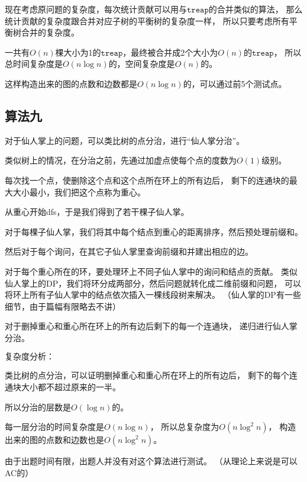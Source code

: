 \documentclass{noiassignment}
\begin{document}
\text{}

现在考虑原问题的复杂度，每次统计贡献可以用与$\texttt{treap}$的合并类似的算法，
那么统计贡献的复杂度跟合并对应子树的平衡树的复杂度一样，
所以只要考虑所有平衡树合并的复杂度。

一共有$O(n)$棵大小为1的$\texttt{treap}$，最终被合并成2个大小为$O(n)$的$\texttt{treap}$，
所以总时间复杂度是$O(n \log n)$的，空间复杂度是$O(n)$的。

这样构造出来的图的点数和边数都是$O(n \log n)$的，可以通过前5个测试点。







\subsection{算法九}

对于仙人掌上的问题，可以类比树的点分治，进行``仙人掌分治''。

类似树上的情况，在分治之前，先通过加虚点使每个点的度数为$O(1)$级别。

每次找一个点，使删除这个点和这个点所在环上的所有边后，
剩下的连通块的最大大小最小，我们把这个点称为重心。

从重心开始dfs，于是我们得到了若干棵子仙人掌。

对于每棵子仙人掌，我们将其中每个结点到重心的距离排序，然后预处理前缀和。

然后对于每个询问，在其它子仙人掌里查询前缀和并建出相应的边。

对于每个重心所在的环，要处理环上不同子仙人掌中的询问和结点的贡献。
类似仙人掌上的DP，我们将环分成两部分，然后问题就转化成二维前缀和问题，
可以将环上所有子仙人掌中的结点依次插入一棵线段树来解决。
（仙人掌的DP有一些细节，由于篇幅有限略去不讲）

对于删掉重心和重心所在环上的所有边后剩下的每一个连通块，
递归进行仙人掌分治。

$\textbf{复杂度分析：}$

类比树的点分治，可以证明删掉重心和重心所在环上的所有边后，
剩下的每个连通块大小都不超过原来的一半。

所以分治的层数是$O(\log n)$的。

每一层分治的时间复杂度是$O(n \log n)$，
所以总复杂度为$O(n \log ^ 2 n)$，
构造出来的图的点数和边数也是$O(n \log ^ 2 n)$。

\text{}

由于出题时间有限，出题人并没有对这个算法进行测试。
（从理论上来说是可以AC的）

\text{}
\end{document}
